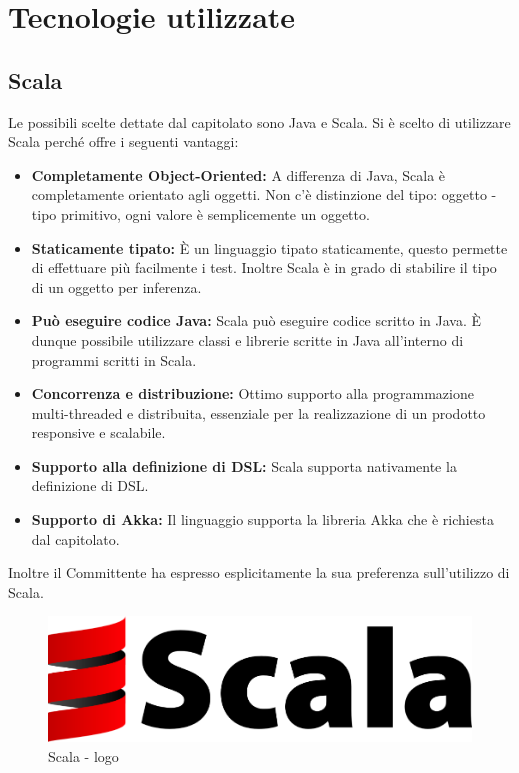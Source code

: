 \documentclass[a4paper]{article}
\begin{document}
		
	\newpage 
	\section{Tecnologie utilizzate}
	\subsection{Scala}
		Le possibili scelte dettate dal capitolato sono Java e Scala. Si è scelto di utilizzare Scala perché offre i seguenti vantaggi:
		\begin{itemize}
            \item \textbf{Completamente Object-Oriented:} A differenza di Java, Scala è completamente orientato agli oggetti. Non c'è distinzione del tipo: oggetto - tipo primitivo, ogni valore è semplicemente un oggetto.
			\item \textbf{Staticamente tipato:} È un linguaggio tipato staticamente, questo permette di effettuare più facilmente i test. Inoltre Scala è in grado di stabilire il tipo di un oggetto per inferenza.
            \item \textbf{Può eseguire codice Java:} Scala può eseguire codice scritto in Java. È dunque possibile utilizzare classi e librerie scritte in Java all'interno di programmi scritti in Scala. 
            \item \textbf{Concorrenza e distribuzione:} Ottimo supporto alla programmazione multi-threaded e distribuita, essenziale per la realizzazione di un prodotto responsive e scalabile.
			\item \textbf{Supporto alla definizione di DSL:} Scala supporta nativamente la definizione di DSL.
            \item \textbf{Supporto di Akka:} Il linguaggio supporta la libreria Akka che è richiesta dal capitolato.
		\end{itemize}
		Inoltre il Committente ha espresso esplicitamente la sua preferenza sull'utilizzo di Scala.
		\begin{figure} [H]
			\centering
			\includegraphics[scale=0.15]{immagini/ST/scala.png}
			\caption{Scala - logo}
		\end{figure}	
\end{document}
